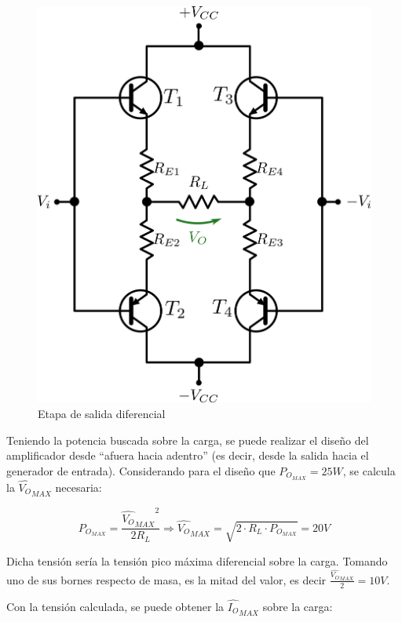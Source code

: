 \begin{figure}[!ht]
\begin{centering}
\includegraphics[scale=0.5]{Imagenes/EtapaSalida.png}
\par\end{centering}
\caption{Etapa de salida diferencial}
\end{figure}

Teniendo la potencia buscada sobre la carga, se puede realizar el diseño del amplificador desde ``afuera hacia adentro'' (es decir, desde la salida hacia el generador de entrada). Considerando para el diseño que $P_{O_{MAX}} = 25W$, se calcula la $\hat{V_O}_{MAX}$ necesaria:

\[
P_{O_{MAX}} = \frac{{\hat{V_O}_{MAX}}^2}{2R_L} \Longrightarrow \hat{V_O}_{MAX} = \sqrt{2 \cdot R_L \cdot P_{O_{MAX}}} = 20V
\] 

Dicha tensión sería la tensión pico máxima diferencial sobre la carga. Tomando uno de sus bornes respecto de masa, es la mitad del valor, es decir $\frac{\hat{V_O}_{MAX}}{2} = 10V$.\par
Con la tensión calculada, se puede obtener la $\hat{I_O}_{MAX}$ sobre la carga:

